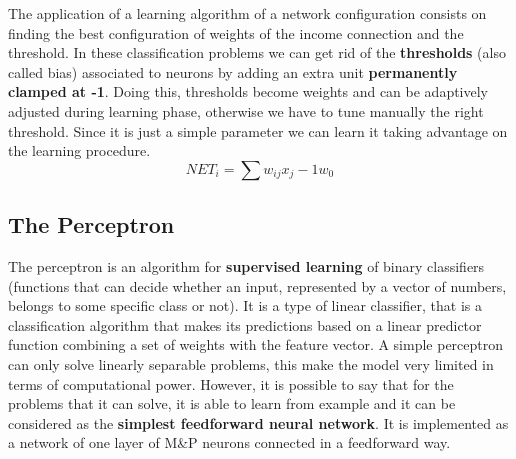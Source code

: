 The application of a learning algorithm of a network configuration consists on finding the best configuration of weights of the income connection and the threshold.
In these classification problems we can get rid of the \textbf{thresholds} (also called bias) associated to neurons by adding an extra unit \textbf{permanently clamped at -1}. Doing this, thresholds become weights and can be adaptively adjusted during learning phase, otherwise we have to tune manually the right threshold. Since it is just a simple parameter we can learn it taking advantage on the learning procedure. 
$$NET_i = \sum w_{ij} x_j -1w_0$$

\subsection{The Perceptron}
The perceptron is an algorithm for \textbf{supervised learning} of binary classifiers (functions that can decide whether an input, represented by a vector of numbers, belongs to some specific class or not). It is a type of linear classifier, that is a classification algorithm that makes its predictions based on a linear predictor function combining a set of weights with the feature vector. A simple perceptron can only solve linearly separable problems, this make the model very limited in terms of computational power. However, it is possible to say that for the problems that it can solve, it is able to learn from example and it can be considered as the \textbf{simplest feedforward neural network}. It is implemented as a network of one layer of M\&P neurons connected in a feedforward way.

